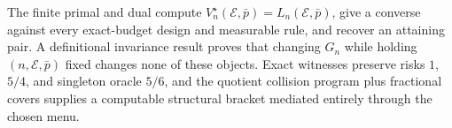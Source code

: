 The finite primal and dual compute \(V_n^\star(\mathcal E,\bar p)=L_n(\mathcal E,\bar p)\), give a converse against every exact-budget design and measurable rule, and recover an attaining pair. A definitional invariance result proves that changing \(G_n\) while holding \((n,\mathcal E,\bar p)\) fixed changes none of these objects. Exact witnesses preserve risks \(1\), \(5/4\), and singleton oracle \(5/6\), and the quotient collision program plus fractional covers supplies a computable structural bracket mediated entirely through the chosen menu.
